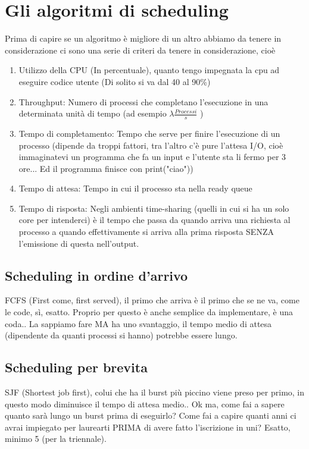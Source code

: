 \documentclass[12pt, a4paper, openany, twoside]{book}
\begin{document}
\section{Gli algoritmi di scheduling}
Prima di capire se un algoritmo è migliore di un altro abbiamo da tenere in 
considerazione ci sono una serie di criteri da tenere in considerazione, cioè
\begin{enumerate}
	\item Utilizzo della CPU (In percentuale), quanto tengo impegnata la cpu
	ad eseguire codice utente (Di solito si va dal 40 al 90\%) 
	\item Throughput: Numero di processi che completano l'esecuzione in una
	determinata unità di tempo (ad esempio $\lambda \frac{Processi}{s}$ )
	\item Tempo di completamento: Tempo che serve per finire l'esecuzione
	di un processo (dipende da troppi fattori, tra l'altro c'è pure l'attesa I/O,
	cioè immaginatevi un programma che fa un input e l'utente sta li fermo
	per 3 ore... Ed il programma finisce con print("ciao"))
	\item Tempo di attesa: Tempo in cui il processo sta nella ready queue
	\item Tempo di risposta: Negli ambienti time-sharing (quelli in cui si ha
	un solo core per intenderci) è il tempo che passa da quando arriva una
	richiesta al processo a quando effettivamente si arriva alla prima risposta
	SENZA l'emissione di questa nell'output. %
\end{enumerate}
\subsection{Scheduling in ordine d'arrivo}
FCFS (First come, first served), il primo che arriva è il primo che se ne va, 
come le code, sì, esatto. Proprio per questo è anche semplice da implementare,
è una coda.. La sappiamo fare MA ha uno svantaggio, il tempo medio di attesa
(dipendente da quanti processi si hanno) potrebbe essere lungo.
\subsection{Scheduling per brevita}
SJF (Shortest job first), colui che ha il burst più piccino viene preso per primo,
in questo modo diminuisce il tempo di attesa medio.. Ok ma, come fai a sapere 
quanto sarà lungo un burst prima di eseguirlo? Come fai a capire quanti anni ci
avrai impiegato per laurearti PRIMA di avere fatto l'iscrizione in uni? Esatto,
minimo 5 (per la triennale).
\end{document}
